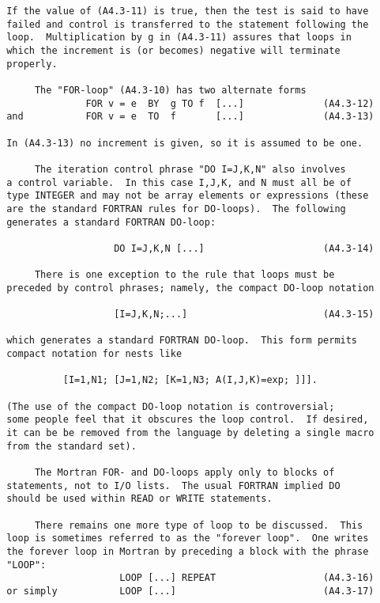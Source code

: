 \newpage \begin{verbatim}
 If the value of (A4.3-11) is true, then the test is said to have
 failed and control is transferred to the statement following the
 loop.  Multiplication by g in (A4.3-11) assures that loops in
 which the increment is (or becomes) negative will terminate
 properly.

      The "FOR-loop" (A4.3-10) has two alternate forms
               FOR v = e  BY  g TO f  [...]              (A4.3-12)
 and           FOR v = e  TO  f       [...]              (A4.3-13)

 In (A4.3-13) no increment is given, so it is assumed to be one.

      The iteration control phrase "DO I=J,K,N" also involves
 a control variable.  In this case I,J,K, and N must all be of
 type INTEGER and may not be array elements or expressions (these
 are the standard FORTRAN rules for DO-loops).  The following
 generates a standard FORTRAN DO-loop:

                    DO I=J,K,N [...]                     (A4.3-14)

      There is one exception to the rule that loops must be
 preceded by control phrases; namely, the compact DO-loop notation

                    [I=J,K,N;...]                        (A4.3-15)

 which generates a standard FORTRAN DO-loop.  This form permits
 compact notation for nests like

           [I=1,N1; [J=1,N2; [K=1,N3; A(I,J,K)=exp; ]]].

 (The use of the compact DO-loop notation is controversial;
 some people feel that it obscures the loop control.  If desired,
 it can be be removed from the language by deleting a single macro
 from the standard set).

      The Mortran FOR- and DO-loops apply only to blocks of
 statements, not to I/O lists.  The usual FORTRAN implied DO
 should be used within READ or WRITE statements.

      There remains one more type of loop to be discussed.  This
 loop is sometimes referred to as the "forever loop".  One writes
 the forever loop in Mortran by preceding a block with the phrase
 "LOOP":
                     LOOP [...] REPEAT                   (A4.3-16)
 or simply           LOOP [...]                          (A4.3-17)
\end{verbatim}
